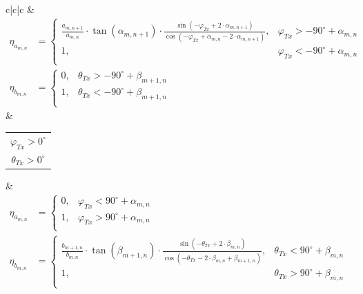 \begin{table}[H]
\begin{tabular}{c|c|c}
	&
	\begin{math}\label{eq:2:SR}
		\begin{aligned}
			\eta_{a_{m,n}} &=
			\begin{cases}
				\frac{a_{m,n+1}}{a_{m,n}} \cdot \tan(\alpha_{m,n+1}) \cdot \frac{\sin(-\varphi_{Tx}+ 2\cdot \alpha_{m,n+1})}{\cos(-\varphi_{Tx}+ \alpha_{m,n}-2 \cdot \alpha_{m,n+1})}, &  \varphi_{Tx} > -90^\circ + \alpha_{m,n} \\
				1, & \varphi_{Tx} < -90^\circ + \alpha_{m,n} \\
			\end{cases}\\
			\eta_{b_{m,n}} &=
			\begin{cases}
				0, & \theta_{Tx} >-90^\circ + \beta_{m+1,n}\\
				1, & \theta_{Tx} < -90^\circ + \beta_{m+1,n}\\
			\end{cases}
		\end{aligned}		
	\end{math}\\
	\hline
	& 
	\begin{tabular}{@{}c@{}}$\varphi_{Tx}>0^\circ $ \\ $\theta_{Tx}>0^\circ $ \end{tabular}
	&
	\begin{math}
		\begin{aligned}
			\eta_{a_{m,n}} &=
			\begin{cases}
				0, & \varphi_{Tx} < 90^\circ + \alpha_{m,n}\\
				1, & \varphi_{Tx} > 90^\circ + \alpha_{m,n}\\
			\end{cases}\\
			\eta_{b_{m,n}} &=
			\begin{cases}
				\frac{b_{m+1,n}}{b_{m,n}} \cdot \tan(\beta_{m+1,n}) \cdot \frac{\sin(-\theta_{Tx}+2 \cdot \beta_{m,n})}{\cos(-\theta_{Tx}-2 \cdot \beta_{m,n}+ \beta_{m+1,n})}, &  \theta_{Tx} < 90^\circ + \beta_{m,n} \\
				1, & \theta_{Tx} > 90^\circ + \beta_{m,n} \\
			\end{cases}\\

\end{aligned}
\end{math}
\end{tabular}
\end{table}
